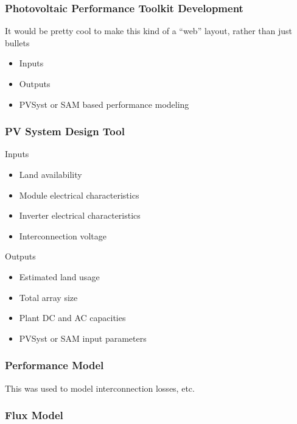 \documentclass[aspectratio=169]{beamer}
\begin{document}
\begin{frame}
  \frametitle{Photovoltaic Performance Toolkit Development}
  It would be pretty cool to make this kind of a ``web'' layout, rather than just bullets
  \begin{itemize}
  \item Inputs
  \item Outputs
  \item PVSyst or SAM based performance modeling
  \end{itemize}
\end{frame}

\begin{frame}
  \frametitle{PV System Design Tool}
  \begin{block}{Inputs}
    \begin{itemize}
      \item Land availability
      \item Module electrical characteristics
      \item Inverter electrical characteristics
      \item Interconnection voltage
    \end{itemize}
  \end{block}

  \begin{block}{Outputs}
    \begin{itemize}
    \item Estimated land usage
    \item Total array size
    \item Plant DC and AC capacities
      \item PVSyst or SAM input parameters
    \end{itemize}
  \end{block}
\end{frame}

\begin{frame}
  \frametitle{Performance Model}
  This was used to model interconnection losses, etc.
\end{frame}

\begin{frame}
  \frametitle{Flux Model}

\end{frame}
\end{document}
